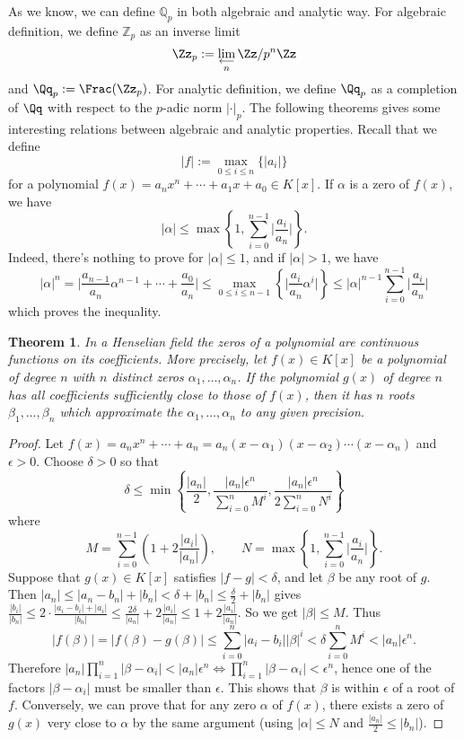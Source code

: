 \documentclass{article}
\newtheorem{theorem}{Theorem}
\begin{document}
As we know, we can define $\mathbb{Q}_{p}$ in both algebraic and analytic way. For algebraic definition, we define $\mathbb{Z}_{p}$ as an inverse limit 
$$
\Zz_{p} := \lim_{\substack{\longleftarrow \\ n}} \Zz/p^{n}\Zz
$$
and $\Qq_{p} := \Frac(\Zz_{p})$. 
For analytic definition, we define $\Qq_{p}$ as a completion of $\Qq$ with respect to the $p$-adic norm $|\cdot |_{p}$. 
The following theorems gives some interesting relations between algebraic and analytic properties.
Recall that we define 
$$
|f| := \max_{0\leq i\leq n}\{|a_{i}|\}
$$
for a polynomial $f(x) = a_{n}x^{n} + \cdots + a_{1}x + a_{0} \in K[x]$. 
If $\alpha$ is a zero of $f(x)$, we have 
$$
|\alpha| \leq \max\left\{ 1, \sum_{i=0}^{n-1} \Big| \frac{a_{i}}{a_{n}} \Big|\right\}.
$$
Indeed, there's nothing to prove for $|\alpha| \leq 1$, and if $|\alpha|>1$, we have
$$
|\alpha|^{n} = \Big| \frac{a_{n-1}}{a_{n}} \alpha^{n-1} + \cdots + \frac{a_{0}}{a_{n}} \Big| \leq \max_{0\leq i\leq n-1} \left\{ \Big| \frac{a_{i}}{a_{n}}\alpha^{i}\Big| \right\} \leq |\alpha|^{n-1}\sum_{i=0}^{n-1} \Big| \frac{a_{i}}{a_{n}}\Big|
$$
which proves the inequality. 
\begin{theorem}
\label{zero}
In a Henselian field the zeros of a polynomial are continuous functions on its coefficients. 
More precisely, let $f(x)\in K[x]$ be a polynomial of degree $n$ with $n$ distinct zeros $\alpha_1, \dots, \alpha_n$. 
If the polynomial $g(x)$ of degree $n$ has all coefficients sufficiently close to those of $f(x)$, then it has $n$ roots $\beta_1, \dots, \beta_n$ which approximate the $\alpha_1, \dots, \alpha_n$ to any given precision.
\end{theorem}
\begin{proof}
Let $f(x) = a_{n}x^{n} + \cdots + a_{n} = a_{n}(x-\alpha_{1})(x-\alpha_{2})\cdots (x-\alpha_{n})$ and $\epsilon >0$. 
Choose $\delta >0$ so that 
$$
\delta \leq \min \left\{ \frac{|a_{n}|}{2}, \frac{|a_{n}|\epsilon^{n}}{\sum_{i=0}^{n}M^{i}}, \frac{|a_{n}|\epsilon^{n}}{2\sum_{i=0}^{n} N^{i}}\right\}
$$
where
$$
M = \sum_{i=0}^{n-1}\left( 1 + 2\frac{|a_{i}|}{|a_{n}|} \right), \qquad N = \max\left\{ 1, \sum_{i=0}^{n-1} \Big| \frac{a_{i}}{a_{n}} \Big|\right\}.
$$
Suppose that $g(x) \in K[x]$ satisfies $|f-g|<\delta$, and let $\beta$ be any root of $g$. 
Then $|a_{n}| \leq |a_{n} - b_{n}| + |b_{n}| < \delta + |b_{n}| \leq \frac{\delta}{2} + |b_{n}|$ gives $\frac{|b_{i}|}{|b_{n}|} \leq 2\cdot \frac{|a_{i}-b_{i}| + |a_i|}{|b_n|} \leq \frac{2\delta}{|a_{n}|} + 2\frac{|a_{i}|}{|a_{n}|} \leq 1 + 2\frac{|a_{i}|}{|a_n|}$. So we get $|\beta| \leq M$. Thus
$$
|f(\beta)| = |f(\beta) - g(\beta)| \leq \sum_{i=0}^{n} |a_i - b_i| |\beta|^{i}< \delta\sum_{i=0}^{n} M^{i} < |a_n| \epsilon^{n}. 
$$
Therefore $|a_{n}| \prod_{i=1}^{n} |\beta - \alpha_i| < |a_n|\epsilon^{n}\Leftrightarrow \prod_{i=1}^{n} |\beta - \alpha_i| < \epsilon^{n}$, hence one of the factors $|\beta - \alpha_i|$ must be smaller than $\epsilon$. 
This shows that $\beta$ is within $\epsilon$ of a root of $f$. 
Conversely, we can prove that for any zero $\alpha$ of $f(x)$, there exists a zero of $g(x)$ very close to $\alpha$ by the same argument (using $|\alpha| \leq N$ and $\frac{|a_n|}{2} \leq |b_n|$). 
\end{proof}
\end{document}
